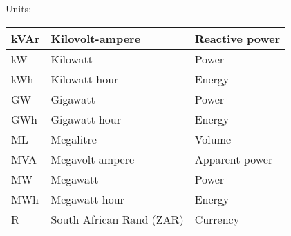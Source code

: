 \begin{center}
Units:
\end{center}
\begin{table}[H]
\centering
\begin{small}
{\tabulinesep=1.4mm
\begin{tabu}{| l | l | l |}
        \hline kVAr     & Kilovolt-ampere          & Reactive power\\
        \hline kW       & Kilowatt                 & Power\\
        \hline kWh      & Kilowatt-hour            & Energy\\
        \hline GW       & Gigawatt                 & Power\\
        \hline GWh      & Gigawatt-hour            & Energy\\
        \hline ML       & Megalitre                & Volume\\
        \hline MVA      & Megavolt-ampere          & Apparent power\\
        \hline MW       & Megawatt                 & Power\\
        \hline MWh      & Megawatt-hour            & Energy\\
        \hline R        & South African Rand (ZAR) & Currency\\
        \hline
\end{tabu}}
\end{small}
\end{table}
